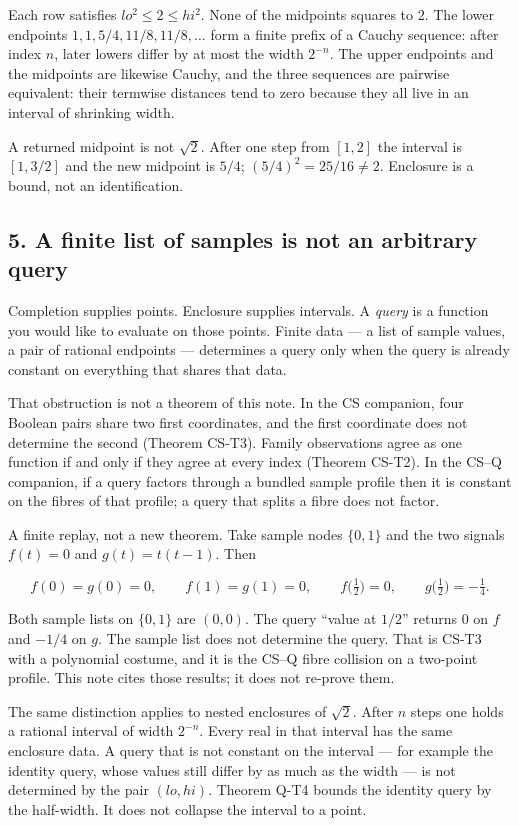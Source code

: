 \documentclass[
  11pt,
]{article}
\begin{document}
Each row satisfies \(lo^2\le 2\le hi^2\). None of the midpoints squares to \(2\). The lower endpoints \(1,1,5/4,11/8,11/8,\ldots\) form a finite prefix of a Cauchy sequence: after index \(n\), later lowers differ by at most the width \(2^{-n}\). The upper endpoints and the midpoints are likewise Cauchy, and the three sequences are pairwise equivalent: their termwise distances tend to zero because they all live in an interval of shrinking width.

A returned midpoint is not \(\sqrt{2}\). After one step from \([1,2]\) the interval is \([1,3/2]\) and the new midpoint is \(5/4\); \((5/4)^2=25/16\neq 2\). Enclosure is a bound, not an identification.

\subsection{5. A finite list of samples is not an arbitrary query}\label{a-finite-list-of-samples-is-not-an-arbitrary-query}

Completion supplies points. Enclosure supplies intervals. A \emph{query} is a function you would like to evaluate on those points. Finite data --- a list of sample values, a pair of rational endpoints --- determines a query only when the query is already constant on everything that shares that data.

That obstruction is not a theorem of this note. In the CS companion, four Boolean pairs share two first coordinates, and the first coordinate does not determine the second (Theorem CS-T3). Family observations agree as one function if and only if they agree at every index (Theorem CS-T2). In the CS--Q companion, if a query factors through a bundled sample profile then it is constant on the fibres of that profile; a query that splits a fibre does not factor.

A finite replay, not a new theorem. Take sample nodes \(\{0,1\}\) and the two signals \(f(t)=0\) and \(g(t)=t(t-1)\). Then

\[
f(0)=g(0)=0,\qquad f(1)=g(1)=0,\qquad f\bigl(\tfrac12\bigr)=0,\qquad
g\bigl(\tfrac12\bigr)=-\tfrac14.
\]

Both sample lists on \(\{0,1\}\) are \((0,0)\). The query ``value at \(1/2\)'' returns \(0\) on \(f\) and \(-1/4\) on \(g\). The sample list does not determine the query. That is CS-T3 with a polynomial costume, and it is the CS--Q fibre collision on a two-point profile. This note cites those results; it does not re-prove them.

The same distinction applies to nested enclosures of \(\sqrt{2}\). After \(n\) steps one holds a rational interval of width \(2^{-n}\). Every real in that interval has the same enclosure data. A query that is not constant on the interval --- for example the identity query, whose values still differ by as much as the width --- is not determined by the pair \((lo,hi)\). Theorem Q-T4 bounds the identity query by the half-width. It does not collapse the interval to a point.
\end{document}
